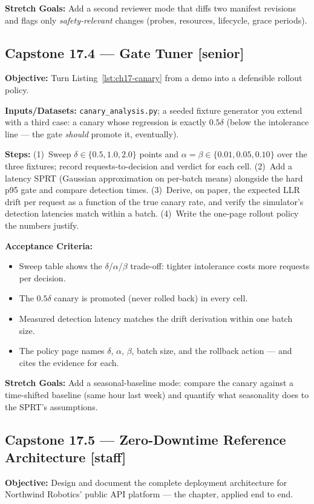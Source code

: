 \textbf{Stretch Goals:} Add a second reviewer mode that diffs two
manifest revisions and flags only \emph{safety-relevant} changes
(probes, resources, lifecycle, grace periods).

\subsection*{Capstone 17.4 --- Gate Tuner \hfill [senior]}
\textbf{Objective:} Turn Listing~\ref{lst:ch17-canary} from a demo into
a defensible rollout policy.

\textbf{Inputs/Datasets:} \texttt{canary\_analysis.py}; a seeded fixture
generator you extend with a third case: a canary whose regression is
exactly $0.5\delta$ (below the intolerance line --- the gate
\emph{should} promote it, eventually).

\textbf{Steps:} (1)~Sweep $\delta \in \{0.5, 1.0, 2.0\}$ points and
$\alpha = \beta \in \{0.01, 0.05, 0.10\}$ over the three fixtures;
record requests-to-decision and verdict for each cell. (2)~Add a
latency SPRT (Gaussian approximation on per-batch means) alongside the
hard p95 gate and compare detection times. (3)~Derive, on paper, the
expected LLR drift per request as a function of the true canary rate,
and verify the simulator's detection latencies match within a batch.
(4)~Write the one-page rollout policy the numbers justify.

\textbf{Acceptance Criteria:}
\begin{itemize}
  \item[$\square$] Sweep table shows the $\delta$/$\alpha$/$\beta$
        trade-off: tighter intolerance costs more requests per decision.
  \item[$\square$] The $0.5\delta$ canary is promoted (never rolled
        back) in every cell.
  \item[$\square$] Measured detection latency matches the drift
        derivation within one batch size.
  \item[$\square$] The policy page names $\delta$, $\alpha$, $\beta$,
        batch size, and the rollback action --- and cites the evidence
        for each.
\end{itemize}

\textbf{Stretch Goals:} Add a seasonal-baseline mode: compare the canary
against a time-shifted baseline (same hour last week) and quantify what
seasonality does to the SPRT's assumptions.

\subsection*{Capstone 17.5 --- Zero-Downtime Reference Architecture
\hfill [staff]}
\textbf{Objective:} Design and document the complete deployment
architecture for Northwind Robotics' public API platform --- the chapter,
applied end to end.

